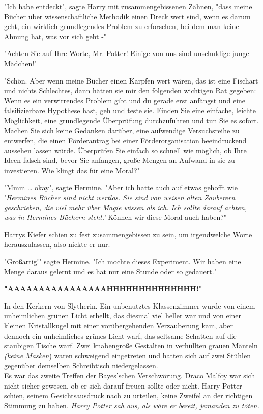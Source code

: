 {"Ich habe entdeckt", sagte Harry mit zusammengebissenen Zähnen, "dass meine Bücher über wissenschaftliche Methodik einen Dreck wert sind, wenn es darum geht, ein wirklich grundlegendes Problem zu erforschen, bei dem man keine Ahnung hat, was vor sich geht -"

"Achten Sie auf Ihre Worte, Mr. Potter! Einige von uns sind unschuldige junge Mädchen!"

"Schön. Aber wenn meine Bücher einen Karpfen wert wären, das ist eine Fischart und nichts Schlechtes, dann hätten sie mir den folgenden wichtigen Rat gegeben: Wenn es ein verwirrendes Problem gibt und du gerade erst anfängst und eine falsifizierbare Hypothese hast, geh und teste sie. Finden Sie eine einfache, leichte Möglichkeit, eine grundlegende Überprüfung durchzuführen und tun Sie es sofort. Machen Sie sich keine Gedanken darüber, eine aufwendige Versuchsreihe zu entwerfen, die einen Förderantrag bei einer Förderorganisation beeindruckend aussehen lassen würde. Überprüfen Sie einfach so schnell wie möglich, ob Ihre Ideen falsch sind, bevor Sie anfangen, große Mengen an Aufwand in sie zu investieren. Wie klingt das für eine Moral?"

"Mmm … okay", sagte Hermine. "Aber ich hatte auch auf etwas gehofft wie '\emph{Hermines Bücher sind nicht wertlos. Sie sind von weisen alten Zauberern geschrieben, die viel mehr über Magie wissen als ich. Ich sollte darauf achten, was in Hermines Büchern steht.'} Können wir diese Moral auch haben?"

Harrys Kiefer schien zu fest zusammengebissen zu sein, um irgendwelche Worte herauszulassen, also nickte er nur.

"Großartig!" sagte Hermine. "Ich mochte dieses Experiment. Wir haben eine Menge daraus gelernt und es hat nur eine Stunde oder so gedauert."

\textbf{"AAAAAAAAAAAAAAAAHHHHHHHHHHHHHH!"}

In den Kerkern von Slytherin. Ein unbenutztes Klassenzimmer wurde von einem unheimlichen grünen Licht erhellt, das diesmal viel heller war und von einer kleinen Kristallkugel mit einer vorübergehenden Verzauberung kam, aber dennoch ein unheimliches grünes Licht warf, das seltsame Schatten auf die staubigen Tische warf. Zwei knabengroße Gestalten in verhüllten grauen Mänteln \emph{(keine Masken}) waren schweigend eingetreten und hatten sich auf zwei Stühlen gegenüber demselben Schreibtisch niedergelassen.\\ Es war das zweite Treffen der Bayes'schen Verschwörung. Draco Malfoy war sich nicht sicher gewesen, ob er sich darauf freuen sollte oder nicht. Harry Potter schien, seinem Gesichtsausdruck nach zu urteilen, keine Zweifel an der richtigen Stimmung zu haben. \emph{Harry Potter sah aus, als wäre er bereit, jemanden zu töten.}

}
